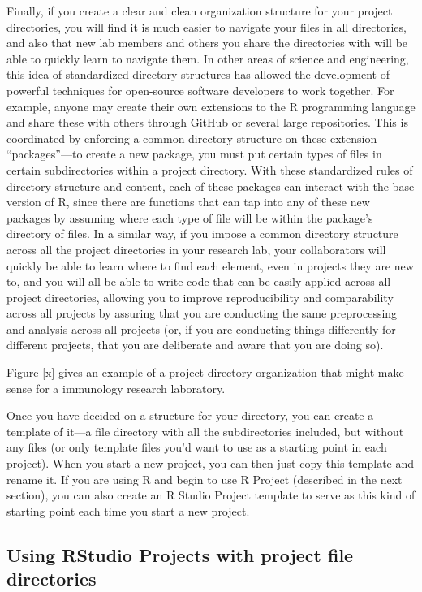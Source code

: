 \documentclass[]{tufte-book}
\begin{document}
Finally, if you create a clear and clean organization structure for your project
directories, you will find it is much easier to navigate your files in all
directories, and also that new lab members and others you share the directories
with will be able to quickly learn to navigate them. In other areas of science
and engineering, this idea of standardized directory structures has allowed the
development of powerful techniques for open-source software developers to work
together. For example, anyone may create their own extensions to the R
programming language and share these with others through GitHub or several large
repositories. This is coordinated by enforcing a common directory structure on
these extension ``packages''---to create a new package, you must put certain types
of files in certain subdirectories within a project directory. With these
standardized rules of directory structure and content, each of these packages
can interact with the base version of R, since there are functions that can tap
into any of these new packages by assuming where each type of file will be
within the package's directory of files. In a similar way, if you impose a
common directory structure across all the project directories in your research
lab, your collaborators will quickly be able to learn where to find each
element, even in projects they are new to, and you will all be able to write
code that can be easily applied across all project directories, allowing you to
improve reproducibility and comparability across all projects by assuring that
you are conducting the same preprocessing and analysis across all projects (or,
if you are conducting things differently for different projects, that you are
deliberate and aware that you are doing so).

Figure {[}x{]} gives an example of a project directory organization that might make
sense for a immunology research laboratory.

Once you have decided on a structure for your directory, you can create a
template of it---a file directory with all the subdirectories included, but
without any files (or only template files you'd want to use as a starting
point in each project). When you start a new project, you can then just
copy this template and rename it. If you are using R and begin to use
R Project (described in the next section), you can also create an R Studio
Project template to serve as this kind of starting point each time you
start a new project.

\hypertarget{using-rstudio-projects-with-project-file-directories}{%
\subsection{Using RStudio Projects with project file directories}\label{using-rstudio-projects-with-project-file-directories}}
\end{document}
